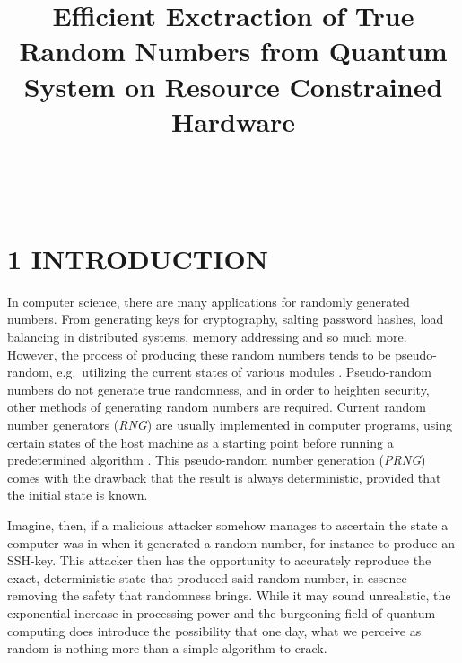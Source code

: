 \documentclass{sigchi}
\def\plaintitle{Efficient Exctraction of True Random Numbers from Quantum System on Resource Constrained Hardware}
\begin{document}
\title{\plaintitle}

\author{%
	\\
	\\
}

\maketitle


\section{1 INTRODUCTION}\label{introduction}

In computer science, there are many applications for randomly generated numbers. From generating keys for cryptography, salting password hashes, load balancing in distributed systems, memory addressing and so much more. However, the process of producing these random numbers tends to be pseudo-random, e.g.~utilizing the current states of various modules \cite{randomness}. Pseudo-random numbers do not generate true randomness, and in order to heighten security, other methods of generating random numbers are required. Current random number generators (\emph{RNG}) are usually implemented in computer programs, using certain states of the host machine as a starting point before running a predetermined algorithm \cite{randomness}. This pseudo-random number generation (\emph{PRNG}) comes with the drawback that the result is always deterministic, provided that the initial state is known.

Imagine, then, if a malicious attacker somehow manages to ascertain the state a computer was in when it generated a random number, for instance to produce an SSH-key. This attacker then has the opportunity to accurately reproduce the exact, deterministic state that produced said random number, in essence removing the safety that randomness brings. While it may sound unrealistic, the exponential increase in processing power and the burgeoning field of quantum computing does introduce the possibility that one day, what we perceive as random is nothing more than a simple algorithm to crack.
\end{document}
